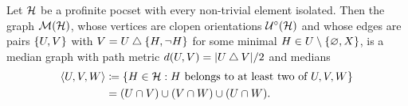 \documentclass[reqno]{amsart}
\begin{document}
    \begin{proposition}\label{prp:construction_of_dual_median_graph}
        Let $\mathcal{H}$ be a profinite pocset with every non-trivial element isolated. Then the graph $\mathcal{M}(\mathcal{H})$, whose vertices are clopen orientations $\mathcal{U}^\circ(\mathcal{H})$ and whose edges are pairs $\left\{U,V\right\}$ with $V=U\bigtriangleup\left\{H,\lnot H\right\}$ for some minimal $H\in U\setminus\left\{\varnothing,X\right\}$, is a median graph with path metric $d(U,V)=|U\bigtriangleup V|/2$ and medians
        \begin{equation*}
            \begin{aligned}
                \left\langle U,V,W\right\rangle&\coloneqq\left\{H\in\mathcal{H}: H\textrm{ belongs to at least two of }U,V,W\right\} \\
                                        &=(U\cap V)\cup(V\cap W)\cup(U\cap W).
            \end{aligned}
        \end{equation*}
    \end{proposition}
\end{document}
